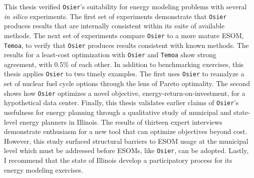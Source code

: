 This thesis verified \texttt{Osier}'s suitability for energy modeling problems
with several \textit{in silico} experiments. The first set of experiments demonstrate that
\texttt{Osier} produces results that are internally consistent within its suite
of available methods. The next set of experiments compare \texttt{Osier} to a
more mature ESOM, \texttt{Temoa}, to verify that \texttt{Osier} produces results
consistent with known methods. The results for a least-cost optimization with
\texttt{Osier} and \texttt{Temoa} show strong agreement, with 0.5\% of each
other. In addition to benchmarking exercises, this thesis applies \texttt{Osier}
to two timely examples. The first uses \texttt{Osier} to reanalyze a set of
nuclear fuel cycle options through the lens of Pareto optimality. The second
shows how \texttt{Osier} optimizes a novel objective,
energy-return-on-investment, for a hypothetical data center. Finally, this
thesis validates earlier claims of \texttt{Osier}'s usefulness for energy
planning through a qualitative study of municipal and state-level energy
planners in Illinois. The results of thirteen expert interviews demonstrate
enthusiasm for a new tool that can optimize objectives beyond cost. However,
this study surfaced structural barriers to ESOM usage at the municipal level
which must be addressed before ESOMs, like \texttt{Osier}, can be adopted.
Lastly, I recommend that the state of Illinois develop a participatory process
for its energy modeling exercises.